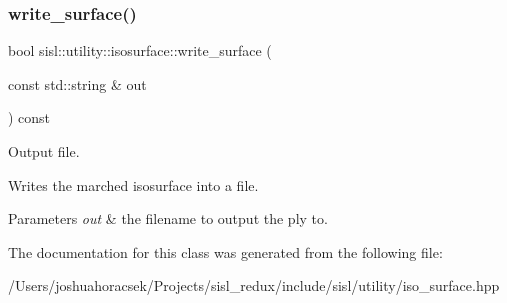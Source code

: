 \subsubsection{\texorpdfstring{write\+\_\+surface()}{write\_surface()}}
{\footnotesize\ttfamily bool sisl\+::utility\+::isosurface\+::write\+\_\+surface (\begin{DoxyParamCaption}\item[{const std\+::string \&}]{out }\end{DoxyParamCaption}) const\hspace{0.3cm}{\ttfamily [inline]}}



Output file. 

Writes the marched isosurface into a file. 
\begin{DoxyParams}{Parameters}
{\em out} & the filename to output the ply to. \\
\hline
\end{DoxyParams}


The documentation for this class was generated from the following file\+:\begin{DoxyCompactItemize}
\item 
/\+Users/joshuahoracsek/\+Projects/sisl\+\_\+redux/include/sisl/utility/iso\+\_\+surface.\+hpp\end{DoxyCompactItemize}
